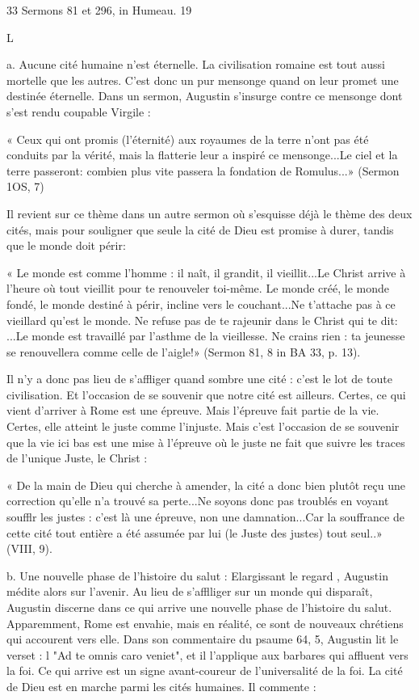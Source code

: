 33 Sermons 81 et 296, in Humeau.
19
 
	L





a.	Aucune cité humaine n'est éternelle. La civilisation romaine est tout	  aussi mortelle que les autres. C'est donc un pur mensonge quand on leur promet une
destinée éternelle. Dans un sermon, Augustin s'insurge contre ce mensonge dont s'est rendu coupable Virgile :

« Ceux qui ont promis (l'éternité) aux royaumes de la terre n'ont pas été conduits par  la vérité, mais la flatterie leur a inspiré ce mensonge...Le ciel et la terre passeront: combien plus vite passera la fondation de Romulus...» (Sermon 1OS, 7)

Il revient sur ce thème dans un autre sermon où s'esquisse déjà le thème des deux cités, mais pour souligner que seule la cité de Dieu est promise à durer, tandis que le monde doit périr:

« Le monde est comme l'homme : il naît, il grandit, il vieillit...Le Christ arrive à l'heure où tout vieillit pour te renouveler toi-même. Le monde créé, le monde fondé, le monde destiné à périr, incline vers le couchant...Ne t'attache pas à ce vieillard qu'est le monde. Ne refuse pas de te rajeunir dans le Christ qui te dit: ...Le monde est travaillé par l'asthme de la vieillesse. Ne crains rien : ta jeunesse se renouvellera comme celle de l'aigle!» (Sermon 81, 8 in BA 33, p. 13).

Il n'y a donc pas lieu de s'affliger quand sombre une cité : c'est le lot de toute civilisation. Et l'occasion de se souvenir que notre cité est ailleurs. Certes, ce qui vient d'arriver à Rome est une épreuve. Mais l'épreuve fait partie de la vie. Certes, elle atteint le juste comme l'injuste. Mais c'est l'occasion de se souvenir que la vie ici­ bas est une mise à l'épreuve où le juste ne fait que suivre les traces de l'unique Juste, le Christ :

« De la main de Dieu qui cherche à amender, la cité a donc bien plutôt reçu une correction qu'elle n'a trouvé sa perte...Ne soyons donc pas troublés en voyant soufflr les justes : c'est là une épreuve, non une damnation...Car la souffrance de cette cité tout entière a été assumée par lui (le Juste des justes) tout seul..» (VIII, 9).

b.	Une nouvelle phase de l'histoire du salut : Elargissant le regard , Augustin médite alors sur l'avenir. Au lieu de s'afflliger sur un monde qui disparaît, Augustin discerne dans ce qui arrive une nouvelle phase de l'histoire du salut. Apparemment, Rome est envahie, mais en réalité, ce sont de nouveaux chrétiens qui
accourent vers elle. Dans son commentaire du psaume 64, 5, Augustin lit le verset : l	"Ad te omnis caro veniet", et il l'applique aux barbares qui affluent vers la foi. Ce qui arrive est un signe avant-coureur de l'universalité de la foi. La cité de Dieu est en
marche parmi les cités humaines. Il commente :

